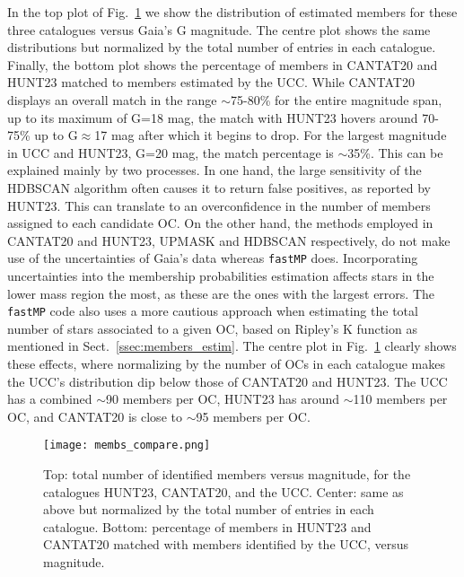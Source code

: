 \documentclass[fleqn,usenatbib]{mnras}
\begin{document}
In the top plot of Fig.~\ref{fig:members} we show the distribution of
estimated members for these three catalogues versus Gaia's G magnitude. The
centre plot shows the same distributions but normalized by the total number of
entries in each catalogue. Finally, the bottom plot shows the percentage of
members in CANTAT20 and HUNT23 matched to members estimated by the UCC. While
CANTAT20 displays an overall match in the range $\sim$75-80\% for the entire
magnitude span, up to its maximum of G=18 mag, the match with HUNT23
hovers around 70-75\% up to G$\approx$17 mag after which it begins to drop.
For the largest magnitude in UCC and HUNT23, G=20 mag, the match
percentage is $\sim$35\%. This can be explained mainly by two processes.
%
In one hand, the large sensitivity of the HDBSCAN algorithm often causes it to
return false positives, as reported by HUNT23. This can translate to
an overconfidence in the number of members assigned to each candidate OC.
On the other hand, the methods employed in CANTAT20 and HUNT23, UPMASK and
HDBSCAN respectively, do not make use of the uncertainties of Gaia's data
whereas \texttt{fastMP} does. Incorporating uncertainties into the membership
probabilities estimation affects stars in the lower mass region the most, as
these are the ones with the largest errors. The \texttt{fastMP} code also uses a
more cautious approach when estimating the total number of stars associated to a
given OC, based on Ripley's K function as mentioned in
Sect.~\ref{ssec:members_estim}. The centre plot in Fig.~\ref{fig:members}
clearly shows these effects, where normalizing by the number of OCs in each
catalogue makes the UCC's distribution dip below those of CANTAT20 and HUNT23.
The UCC has a combined $\sim$90 members per OC, HUNT23 has around $\sim$110
members per OC, and CANTAT20 is close to $\sim$95 members per OC.
%

\begin{figure}
	\texttt{[image: membs\_compare.png]}
    \caption{Top: total number of identified members versus magnitude, for
    the catalogues HUNT23, CANTAT20, and the UCC.
    Center: same as above but normalized by the total number of entries in each
    catalogue.
    Bottom: percentage of members in HUNT23 and CANTAT20 matched with members
    identified by the UCC, versus magnitude.}
    \label{fig:members}
\end{figure}
\end{document}
